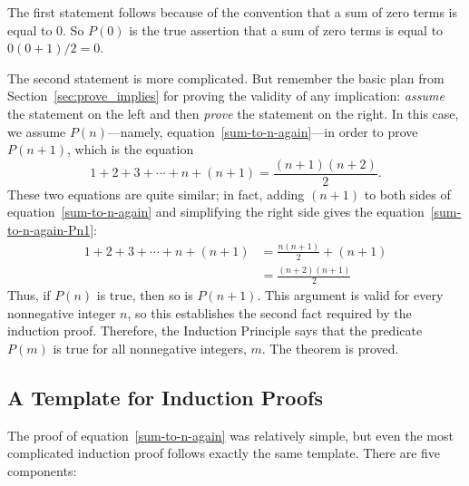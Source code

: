 The first statement follows because of the convention that a sum of
zero terms is equal to 0.  So $P(0)$ is the true assertion that a sum
of zero terms is equal to $0(0+1)/2 = 0$.

The second statement is more complicated.  But remember the basic
plan from Section~\ref{sec:prove_implies} for proving the validity of
any implication: \emph{assume} the statement on the left and then
\emph{prove} the statement on the right.  In this case, we assume
$P(n)$---namely, equation~\eqref{sum-to-n-again}---in order to prove
$P(n+1)$, which is the equation
\begin{equation}\label{sum-to-n-again-Pn1}
1 + 2 + 3 + \cdots + n + (n+1) = \frac{(n+1)(n+2)}{2}.
\end{equation}
These two equations are quite similar; in fact, adding $(n+1)$ to both
sides of equation~\eqref{sum-to-n-again} and simplifying the right side 
gives the equation~\eqref{sum-to-n-again-Pn1}:
\begin{align*}
1 + 2 + 3 + \cdots + n + (n+1)
    & = \frac{n(n+1)}{2} + (n+1) \\
    & = \frac{(n+2)(n+1)}{2}
\end{align*}
Thus, if $P(n)$ is true, then so is $P(n+1)$.  This argument is valid
for every nonnegative integer $n$, so this establishes the second fact
required by the induction proof.  Therefore, the Induction Principle
says that the predicate $P(m)$ is true for all nonnegative integers,
$m$.  The theorem is proved.

\iffalse
In effect, we've just proved
that $P(0)$ implies $P(1)$, $P(1)$ implies $P(2)$, $P(2)$ implies
$P(3),\dots$, all in one fell swoop.
\fi

\subsection{A Template for Induction Proofs}
\label{templ-induct-proofs}

The proof of equation~\eqref{sum-to-n-again} was relatively simple,
but even the most complicated induction proof follows exactly the same
template.  There are five components:

